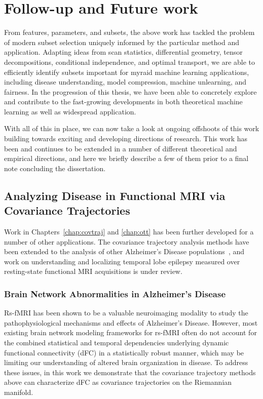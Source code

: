 \chapter{Follow-up and Future work}\label{chap:discuss}

From features, parameters, and subsets, the above work has tackled the problem of modern subset selection uniquely informed by the particular method and application. 
Adapting ideas from 
scan statistics,
differential geometry,
tensor decompositions,
conditional independence,
and optimal transport,
we are able
to efficiently identify subsets 
important
for myraid machine learning applications, including disease understanding,
model compression,
machine unlearning,
and fairness.
In the progression of this thesis,
we have been able to concretely
explore and contribute to the 
fast-growing developments
in both theoretical machine learning
as well as widespread application.

With all of this in place,
we can now take a look at ongoing offshoots of this work building towards exciting and developing directions of research.
This work has been
and continues to be extended in a number of different theoretical and empirical directions,
and here we briefly describe a few of them prior to a final note concluding the dissertation.


\section{Analyzing Disease in Functional MRI via Covariance Trajectories}

Work in Chapters~\ref{chap:covtraj} and \ref{chap:ott} has been further developed for a number of other applications.
The covariance trajectory analysis
methods have been extended 
to the analysis of other Alzheimer's Disease populations~\citep{isbi},
and work on understanding and localizing temporal lobe epilepsy
measured over resting-state functional MRI acquisitions is under review.

\subsection{Brain Network Abnormalities in Alzheimer's Disease}
Rs-fMRI has been shown to be a valuable neuroimaging modality to study the pathophysiological mechanisms and effects of Alzheimer's Disease. 
However, most existing brain network modeling frameworks for rs-fMRI often do not account for the combined statistical and temporal dependencies underlying dynamic functional connectivity (dFC) in a statistically robust manner, 
which may be limiting our understanding of altered brain organization in disease.
To address these issues, in this work we demonstrate that
the covariance trajectory methods above can characterize dFC as covariance trajectories on the Riemannian manifold.


